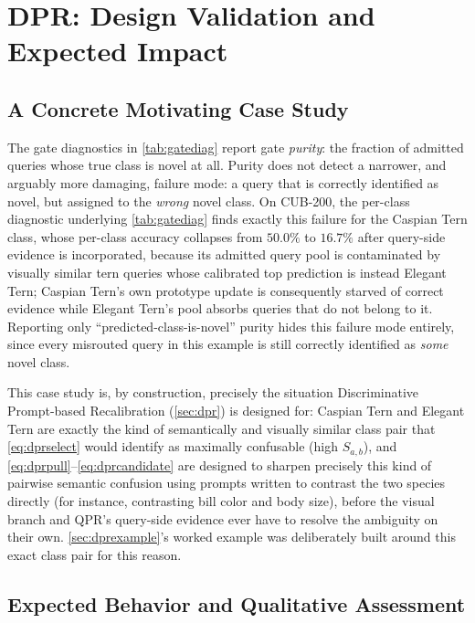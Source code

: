 \documentclass{iutbscthesis}
\begin{document}
\section{DPR: Design Validation and Expected Impact}
\label{sec:dprresults}

\subsection{A Concrete Motivating Case Study}
\label{sec:casestudy}

The gate diagnostics in \autoref{tab:gatediag} report gate \emph{purity}: the fraction of admitted queries whose true class is novel at all. Purity does not detect a narrower, and arguably more damaging, failure mode: a query that is correctly identified as novel, but assigned to the \emph{wrong} novel class. On CUB-200, the per-class diagnostic underlying \autoref{tab:gatediag} finds exactly this failure for the Caspian Tern class, whose per-class accuracy collapses from $50.0\%$ to $16.7\%$ after query-side evidence is incorporated, because its admitted query pool is contaminated by visually similar tern queries whose calibrated top prediction is instead Elegant Tern; Caspian Tern's own prototype update is consequently starved of correct evidence while Elegant Tern's pool absorbs queries that do not belong to it. Reporting only ``predicted-class-is-novel'' purity hides this failure mode entirely, since every misrouted query in this example is still correctly identified as \emph{some} novel class.

This case study is, by construction, precisely the situation Discriminative Prompt-based Recalibration (\autoref{sec:dpr}) is designed for: Caspian Tern and Elegant Tern are exactly the kind of semantically and visually similar class pair that \autoref{eq:dprselect} would identify as maximally confusable (high $S_{a,b}$), and \autoref{eq:dprpull}--\autoref{eq:dprcandidate} are designed to sharpen precisely this kind of pairwise semantic confusion using prompts written to contrast the two species directly (for instance, contrasting bill color and body size), before the visual branch and QPR's query-side evidence ever have to resolve the ambiguity on their own. \autoref{sec:dprexample}'s worked example was deliberately built around this exact class pair for this reason.

\subsection{Expected Behavior and Qualitative Assessment}
\end{document}

